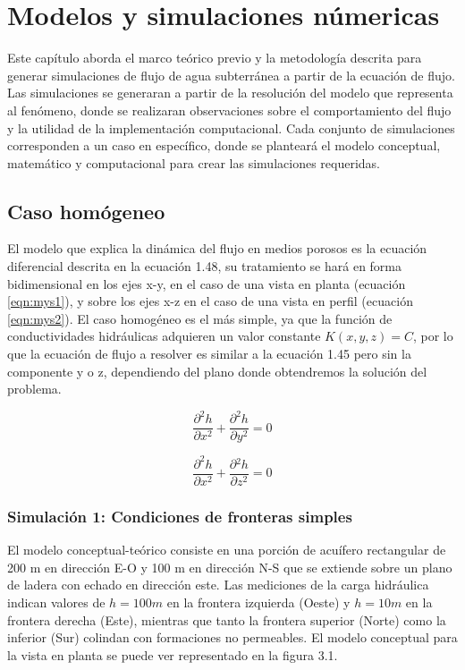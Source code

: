 \chapter{Modelos y simulaciones númericas}

Este capítulo aborda el marco teórico previo y la metodología descrita para generar simulaciones de flujo de agua subterránea a partir de la ecuación de flujo. Las simulaciones se generaran a partir de la resolución del modelo que representa al fenómeno, donde se realizaran observaciones sobre el comportamiento del flujo y la utilidad de la implementación computacional. Cada conjunto de simulaciones corresponden a un caso en específico, donde se planteará el modelo conceptual, matemático y computacional para crear las simulaciones requeridas.

\section{Caso homógeneo}

El modelo que explica la dinámica del flujo en medios porosos es la ecuación diferencial descrita en la ecuación 1.48, su tratamiento se hará en forma bidimensional en los ejes x-y, en el caso de una vista en planta (ecuación \ref{eqn:mys1}), y sobre los ejes x-z en el caso de una vista en perfil (ecuación \ref{eqn:mys2}). El caso homogéneo es el más simple, ya que la función de conductividades hidráulicas adquieren un valor constante $K(x,y,z)=C$, por lo que la ecuación de flujo a resolver es similar a la ecuación 1.45 pero sin la componente y o z, dependiendo del plano donde obtendremos la solución del problema.

 \begin{equation}
 \label{eqn:mys1}
 \dfrac{\partial^{2}h}{\partial{x^{2}}}+\dfrac{\partial^{2}h}{\partial{y^{2}}}=0
\end{equation} 

 \begin{equation}
 \label{eqn:mys2}
 \dfrac{\partial^{2}h}{\partial{x^{2}}}+\dfrac{\partial{^{2}h}}{\partial{z^{2}}}=0
\end{equation} 

\subsection{Simulación 1: Condiciones de fronteras simples}

El modelo conceptual-teórico consiste en una porción de acuífero rectangular de 200 m en dirección E-O y 100 m en dirección N-S que se extiende sobre un plano de ladera con echado en dirección este. Las mediciones de la carga hidráulica indican valores de $h=100m$ en la frontera izquierda (Oeste) y $h=10m$ en la frontera derecha (Este), mientras que tanto la frontera superior (Norte) como la inferior (Sur) colindan con formaciones no permeables. El modelo conceptual para la vista en planta se puede ver representado en la figura 3.1. 

